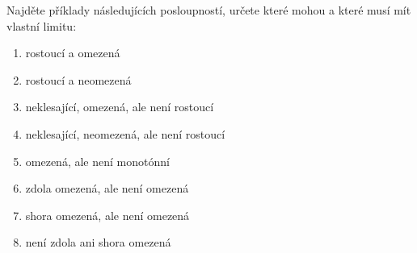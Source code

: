 Najděte příklady následujících posloupností, určete které mohou a které musí mít vlastní limitu:
\begin{enumerate}
	\item  rostoucí a omezená
	\item  rostoucí a neomezená
	\item  neklesající, omezená, ale není rostoucí
	\item  neklesající, neomezená, ale není rostoucí
	\item  omezená, ale není monotónní
	\item  zdola omezená, ale není omezená
	\item  shora omezená, ale není omezená
	\item  není zdola ani shora omezená
\end{enumerate}

